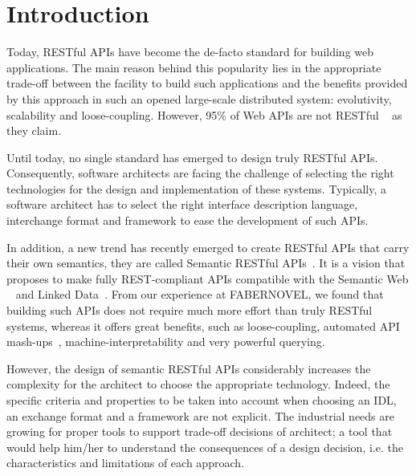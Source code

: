 \section{Introduction}

\vspace*{-0.2cm}


Today, RESTful APIs \cite{FieldingThesis} have become the de-facto standard for building web applications. The main reason behind this popularity lies in the appropriate trade-off between the facility to build such applications and the benefits provided by this approach in such an opened large-scale distributed system: evolutivity, scalability and loose-coupling. However, 95\% of Web APIs are not RESTful ~\cite{10.1007/978-3-319-38791-8_2} as they claim.

Until today, no single standard has emerged to design truly RESTful APIs. Consequently, software architects are facing the challenge of selecting the right technologies for the design and implementation of these systems. Typically, a software architect has to select the right interface description language, interchange format and framework to ease the development of such APIs.

In addition, a new trend has recently emerged to create RESTful APIs that carry their own semantics, they are called Semantic RESTful APIs~\cite{7195633}. It is a vision that proposes to make fully REST-compliant APIs compatible with the Semantic Web ~\cite{TheSemanticWeb} and Linked Data~\cite{LinkedDataPrinciples}. From our experience at FABERNOVEL, we found that building such APIs does not require much more effort than truly RESTful systems, whereas it offers great benefits, such as loose-coupling, automated API mash-ups~\cite{benslimane2008services}, machine-interpretability and very powerful querying. 

However, the design of semantic RESTful APIs considerably increases the complexity for the architect to choose the appropriate technology. Indeed, the specific criteria and properties to be taken into account when choosing an IDL, an exchange format and a framework are not explicit. 
The industrial needs are growing for  proper tools to support trade-off decisions of architect; a tool that would help him/her  to understand the consequences of a design decision, i.e. the characteristics and limitations of each approach. 

